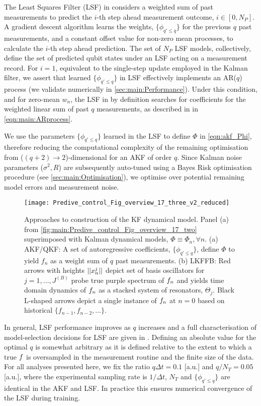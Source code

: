 The Least Squares Filter (LSF) in \cite{mavadia2017} considers a weighted sum of past measurements to predict the $i$-th step ahead measurement outcome, $i \in [0, N_P]$. A gradient descent algorithm learns the weights, $\{\phi_{q' \leq q}\}$ for the previous $q$ past measurements, and a constant offset value for non-zero mean processes, to calculate the $i$-th step ahead prediction. The set of $N_P$ LSF models, collectively, define the set of predicted qubit states under an LSF acting on a measurement record.  For $i=1$, equivalent to the single-step update employed in the Kalman filter, we assert that learned $\{\phi_{q' \leq q}\}$ in LSF effectively implements an AR($q$) process (we validate numerically in \cref{sec:main:Performance}). Under this condition, and for zero-mean $w_n$, the LSF in \cite{mavadia2017} by definition searches for coefficients for the weighted linear sum of past $q$ measurements, as described in in \cref{eqn:main:ARprocess}. 

We use the parameters $\{\phi_{q' \leq q}\}$ learned in the LSF to define $\Phi$ in \cref{eqn:akf_Phi}, therefore reducing the computational complexity of the remaining optimisation from ($(q+2)\to 2$)-dimensional for an AKF of order $q$. Since Kalman noise parameters ($\sigma^2, R$) are subsequently auto-tuned using a Bayes Risk optimisation procedure (see \cref{sec:main:Optimisation}), we optimise over potential remaining model errors and measurement noise.  

\begin{figure} [tp]
	\texttt{[image: Predive\_control\_Fig\_overview\_17\_three\_v2\_reduced]}
	\caption{\label{Predive_control_Fig_overview_17_three} Approaches to construction of the KF dynamical model.  Panel (a) from \cref{fig:main:Predive_control_Fig_overview_17_two} superimposed with Kalman dynamical models, $\Phi \equiv \Phi_n, \forall n$.  (a) AKF/QKF: A set of autoregressive coefficients, $\{\phi_{q'\leq q}\}$, define $\Phi$ to yield $f_n$ as a weight sum of $q$ past measurements. (b) LKFFB: Red arrows with heights $||x^j_n||$ depict set of basis oscillators for $j = 1, \hdots, J^{(B)}$ probe true purple spectrum of $f_n$ and yields time domain dynamics of $f_n$ as a stacked system of resonators, $\Theta_j$. Black L-shaped arrows depict a single instance of $f_n$ at $n=0$ based on historical $\{f_{n-1}, f_{n-2}, \hdots\} $.} 	
\end{figure}

In general, LSF performance improves as $q$ increases and a full characterisation of model-selection decisions for LSF are given in \cite{mavadia2017}. Defining an absolute value for the optimal $q$ is somewhat arbitrary as it is defined relative to the extent to which a true $f$ is oversampled in the measurement routine and the finite size of the data. For all analyses presented here, we fix the ratio $q \Delta t = 0.1 $ [a.u.] and $q / N_T = 0.05$ [a.u.], where the experimental sampling rate is $1/\Delta t$, $N_T$ and $\{\phi_{q' \leq q}\}$ are identical in the AKF and LSF.   In practice this ensures numerical convergence of the LSF during training.

